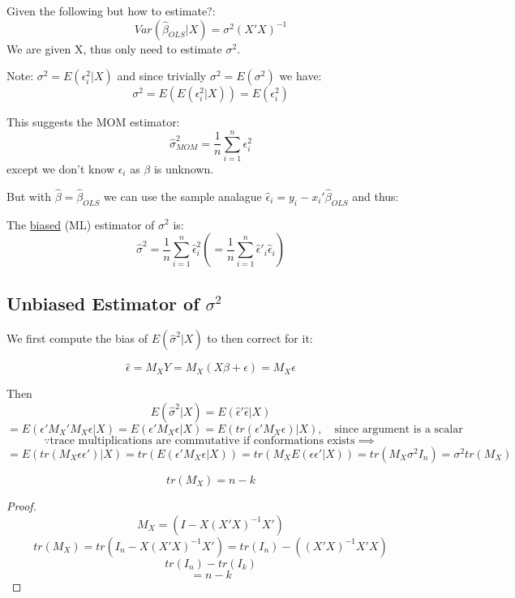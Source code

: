 \documentclass[DIV=14,titlepage=false]{scrreprt}
\begin{document}
Given the following but how to estimate?:
\[Var(\hat{\beta}_{OLS}|X)=\sigma^2(X'X)^{-1}\]
We are given X, thus only need to estimate \(\sigma^2\).

Note: \(\sigma^2=E(\epsilon_i^2|X)\) and since trivially \(\sigma^2=E(\sigma^2)\) we have:
\[\sigma^2=E(E(\epsilon_i^2|X))=E(\epsilon_i^2)\]

This suggests the MOM estimator:
\[\hat{\sigma}^2_{MOM}=\frac{1}{n}\sum_{i=1}^n{\epsilon}_i^2\]except we don't know \(\epsilon_i\) as \(\beta\) is unknown.

But with \(\hat{\beta}=\hat{\beta}_{OLS}\) we can use the sample analague \(\hat{\epsilon}_i=y_i-x_i'\hat{\beta}_{OLS}\) and thus:
\vspace{5mm}
\begin{theorem} The \underline{biased} (ML) estimator of \(\sigma^2\) is:
    \[\hat{\sigma}^2=\frac{1}{n}\sum_{i=1}^n{\hat{\epsilon}}_i^2\left(=\frac{1}{n}\sum_{i=1}^n\hat{\epsilon}'_i\hat{\epsilon}_i\right)\]
\end{theorem}

\subsection{Unbiased Estimator of \(\sigma^2\)}

We first compute the bias of \(E(\hat{\sigma}^2|X)\) to then correct for it:

\vspace{5mm}

\begin{lemma}
    \[\hat{\epsilon}=M_XY=M_X(X\beta+\epsilon)=M_X\epsilon\]
\end{lemma}

Then  \[E(\hat{\sigma}^2|X) = E(\hat{\epsilon}'\hat{\epsilon}|X)\]
\[=E(\epsilon'M_X'M_X\epsilon|X) = E(\epsilon'M_X\epsilon|X) = E(tr(\epsilon'M_X\epsilon)|X) , \quad \text{since argument is a scalar}\] \[\because\text{trace multiplications are commutative if conformations exists}\implies\]
\[=E(tr(M_X\epsilon\epsilon')|X)=tr(E(\epsilon'M_X\epsilon|X)) = tr(M_XE(\epsilon\epsilon'|X)) = tr(M_X\sigma^2I_n) = \sigma^2tr(M_X)\]

\begin{lemma}
    \[tr(M_X)=n-k\]
\end{lemma}
\vspace{5mm}    
\begin{proof}
    \[M_X=(I-X(X'X)^{-1}X')\]
    \[tr(M_X)=tr(I_n-X(X'X)^{-1}X')=tr(I_n)-((X'X)^{-1}X'X)\]
    \[tr(I_n)-tr(I_k)\]
    \[=n-k\]
\end{proof}
\end{document}
